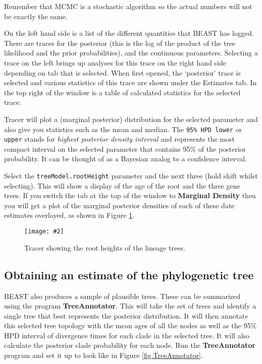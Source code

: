 \documentclass{article}
\newcommand{\includeimage}[2][]{%
\texttt{[image: \#2]}
}
\begin{document}
Remember that MCMC is a stochastic algorithm so the actual numbers will not be exactly the same.

On the left hand side is a list of the different quantities that BEAST has logged. There are traces for the posterior (this
is the log of the product of the tree likelihood and the prior probabilities), and the continuous parameters. Selecting a trace
on the left brings up analyses for this trace on the right hand side depending on tab that is selected. When first opened, the
`posterior' trace is selected and various statistics of this trace are shown under the Estimates tab.
In the top right of the window is a table of calculated statistics for the selected trace. 

Tracer will plot a (marginal posterior) distribution for the selected parameter and also give you statistics such as the mean and median. The \texttt{95\% HPD lower} or \texttt {upper} stands for {\it highest posterior density interval} and represents the most compact interval on the selected parameter that contains 95\% of the posterior probability. It can be thought of as a Bayesian analog to a confidence interval. 

Select the \texttt{treeModel.rootHeight} parameter and the next three (hold shift whilst selecting). This will show a display of the
age of the root and the three gene trees. If you switch the tab at the top of the window to {\bf Marginal Density} then you will get a plot of the marginal posterior densities of each of these date estimates overlayed,
as shown in Figure \ref{fig.tracer2}.

\begin{figure}
\centering
\includeimage[width=\textwidth]{figures/Tracer2}

\caption{\label{fig.tracer2} Tracer showing the root heights of the lineage trees.}
\end{figure}


\subsection*{Obtaining an estimate of the phylogenetic tree}

BEAST also produces a sample of plausible trees. 
These can be summarized using the program {\bf TreeAnnotator}. This will take the set of trees and identify a single tree that best represents the posterior distribution. It will then annotate this selected tree topology with the mean ages of all the
nodes as well as the 95\% HPD interval of divergence times for each clade in the selected tree. It will also calculate the posterior clade probability for each
node. Run the {\bf TreeAnnotator} program and set it up to look like in Figure \ref{fig.TreeAnnotator}.
\end{document}
